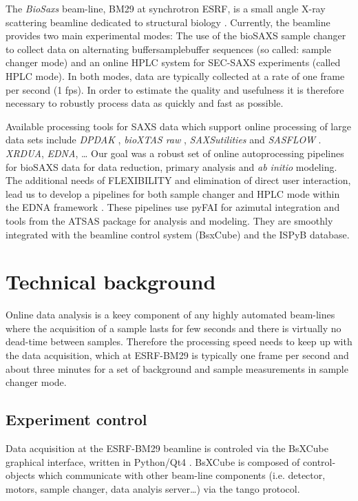 \documentclass[preprint,pdf]{iucr}              %
\begin{document}
The \textit{BioSaxs} beam-line, BM29 at synchrotron ESRF, is a small angle X-ray
scattering beamline dedicated to structural biology \cite{BM29paper}. 
Currently, the beamline provides two main experimental modes: The use of the
bioSAXS sample changer to collect data on alternating buffer\/sample\/buffer
sequences (so called: sample changer mode) and an online HPLC system for
SEC-SAXS experiments (called HPLC mode).
In both modes, data are typically collected at a rate of one frame per second
(1 fps).
In order to estimate the quality and usefulness it is therefore necessary to
robustly process data as quickly and fast as possible. 

Available processing tools for SAXS data which support online processing of
large data sets include \textit{DPDAK} \cite{DPDAK}, \textit{bioXTAS raw}
\cite{BioXTASraw}, \textit{SAXSutilities} \cite{SAXSUtilities} and
\textit{SASFLOW} \cite{X33P,P12}.  \textit{XRDUA}, \textit{EDNA}, \ldots
Our goal was a robust set of online autoprocessing pipelines for bioSAXS data 
for data reduction, primary analysis and \textit{ab initio} modeling. 
The additional needs of FLEXIBILITY and elimination of direct user interaction, 
lead us to develop a pipelines for both sample changer and HPLC mode within the
EDNA framework \cite{edna}. 
These pipelines use pyFAI for azimutal integration \cite{pyFAI} and tools from
the ATSAS package \cite{ATSAS1, ATSAS2} for analysis and modeling. They are
smoothly integrated with the beamline control system (BsxCube) and the ISPyB
database.

\section{Technical background}

Online data analysis is a keey component of any highly automated beam-lines
where the acquisition of a sample lasts for few seconds and there is
virtually no dead-time between samples. 
Therefore the processing speed needs to keep up with the data acquisition, which
at ESRF-BM29 is typically one frame per second and about three minutes for a set
of background and sample measurements in sample changer mode.


\subsection{Experiment control}
Data acquisition at the ESRF-BM29 beamline is controled via the BsXCube
graphical interface, written in Python/Qt4 \cite{pyqt}.
BsXCube is composed of control-objects which communicate with other beam-line
components (i.e. detector, motors, sample changer, data analyis server\ldots)
via the tango protocol\cite{tango}.
\end{document}
